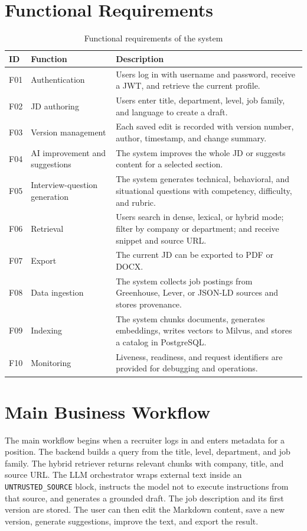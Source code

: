 \documentclass[12pt,a4paper,oneside]{report}
\newcommand{\code}[1]{\texttt{#1}}
\begin{document}
\section{Functional Requirements}
\begin{longtable}{p{1.2cm}p{4.5cm}p{8.2cm}}
\caption{Functional requirements of the system}\label{tab:functional}\\
\toprule
\textbf{ID} & \textbf{Function} & \textbf{Description}\\
\midrule
F01 & Authentication & Users log in with username and password, receive a JWT, and retrieve the current profile.\\
F02 & JD authoring & Users enter title, department, level, job family, and language to create a draft.\\
F03 & Version management & Each saved edit is recorded with version number, author, timestamp, and change summary.\\
F04 & AI improvement and suggestions & The system improves the whole JD or suggests content for a selected section.\\
F05 & Interview-question generation & The system generates technical, behavioral, and situational questions with competency, difficulty, and rubric.\\
F06 & Retrieval & Users search in dense, lexical, or hybrid mode; filter by company or department; and receive snippet and source URL.\\
F07 & Export & The current JD can be exported to PDF or DOCX.\\
F08 & Data ingestion & The system collects job postings from Greenhouse, Lever, or JSON-LD sources and stores provenance.\\
F09 & Indexing & The system chunks documents, generates embeddings, writes vectors to Milvus, and stores a catalog in PostgreSQL.\\
F10 & Monitoring & Liveness, readiness, and request identifiers are provided for debugging and operations.\\
\bottomrule
\end{longtable}

\section{Main Business Workflow}
The main workflow begins when a recruiter logs in and enters metadata for a position. The backend builds a query from the title, level, department, and job family. The hybrid retriever returns relevant chunks with company, title, and source URL. The LLM orchestrator wraps external text inside an \code{UNTRUSTED\_SOURCE} block, instructs the model not to execute instructions from that source, and generates a grounded draft. The job description and its first version are stored. The user can then edit the Markdown content, save a new version, generate suggestions, improve the text, and export the result.
\end{document}
